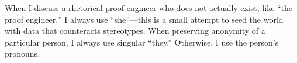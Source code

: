 When I discuss a rhetorical proof engineer who does not actually exist,
like ``the proof engineer,'' I always use ``she''---this is a small attempt
to seed the world with data that counteracts stereotypes. 
When preserving anonymity of a particular person, I always use singular ``they.''
Otherwise, I use the person's pronouns.



